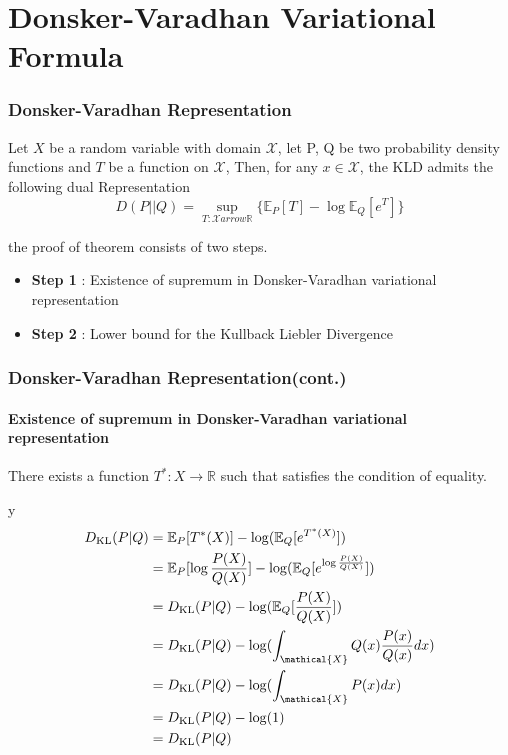 \documentclass{beamer}
\begin{document}
\section{Donsker-Varadhan Variational Formula}
	\begin{frame}
		\frametitle{Donsker-Varadhan Representation}
		\begin{theorem}
			Let $X$ be a random variable with domain $\mathcal{X}$, let P, Q be two probability density functions
			and $T$ be a function on $\mathcal{X}$, 
			Then, for any $x \in \mathcal{X}$, the KLD admits the following dual Representation
			\begin{equation*}
				D(P || Q) = \sup_{T:\mathcal{X} arrow \mathbb{R}} \{ \mathbb{E}_P[T] - \log \mathbb{E}_Q[e^{T}]\}
			\end{equation*}
		\end{theorem}
		the proof of theorem consists of two steps.
		\begin{itemize}
			\item \textbf{Step 1} : Existence of supremum in Donsker-Varadhan variational representation
			\item \textbf{Step 2} : Lower bound for the Kullback Liebler Divergence
		\end{itemize}	
	\end{frame}

	\begin{frame}
		\frametitle{Donsker-Varadhan Representation(cont.)}
		\framesubtitle{Existence of supremum in Donsker-Varadhan variational representation}
		\begin{lemma}
			There exists a function $T^*: X \rightarrow \mathbb{R}$ such that satisfies the condition of equality.
		\end{lemma}
		y
		\begin{align}
			D_{\text{KL}}(P|Q) &= \mathbb{E}_P[T^*(X)] - \log(\mathbb{E}_Q[e^{T^*(X)}])\\			
			&= \mathbb{E}_P [\log \frac{P(X)}{Q(X)}]-\log(\mathbb{E}_Q[e^{\log\frac{P(X)}{Q(X)}}])\\
			&= D_{\text{KL}}(P|Q) - \log(\mathbb{E}_Q[\frac{P(X)}{Q(X)}])\\
			&= D_{\text{KL}}(P|Q) - \log(\int_\mathical{X} Q(x)\frac{P(x)}{Q(x)}dx)\\
			&= D_{\text{KL}}(P|Q) - \log(\int_\mathical{X} P(x)dx)\\
			&= D_{\text{KL}}(P|Q) - \log(1)\\
			&= D_{\text{KL}}(P|Q)
		\end{align}

	\end{frame}
\end{document}
